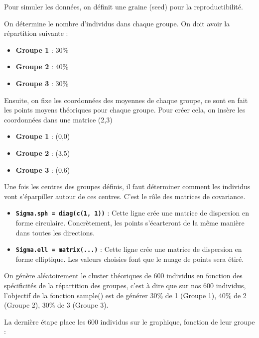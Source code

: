 \documentclass{article}
\providecommand{\tightlist}{%
  \setlength{\itemsep}{2pt}\setlength{\parskip}{0pt}}
\begin{document}
Pour simuler les données, on définit une graine (seed) pour la
reproductibilité.

On détermine le nombre d'individus dans chaque groupe. On doit avoir la
répartition suivante :

\begin{itemize}
\tightlist
\item
  \textbf{Groupe 1} : 30\%
\item
  \textbf{Groupe 2} : 40\%
\item
  \textbf{Groupe 3} : 30\%
\end{itemize}

Ensuite, on fixe les coordonnées des moyennes de chaque groupe, ce sont
en fait les points moyens théoriques pour chaque groupe. Pour créer
cela, on insère les coordonnées dans une matrice (2,3)

\begin{itemize}
\tightlist
\item
  \textbf{Groupe 1} : (0,0)
\item
  \textbf{Groupe 2} : (3,5)
\item
  \textbf{Groupe 3} : (0,6)
\end{itemize}

Une fois les centres des groupes définis, il faut déterminer comment les
individus vont s'éparpiller autour de ces centres. C'est le rôle des
matrices de covariance.

\begin{itemize}
\tightlist
\item
  \textbf{\texttt{Sigma.sph\ =\ diag(c(1,\ 1))}} : Cette ligne crée une
  matrice de dispersion en forme circulaire. Concrètement, les points
  s'écarteront de la même manière dans toutes les directions.
\item
  \textbf{\texttt{Sigma.ell\ =\ matrix(...)}} : Cette ligne crée une
  matrice de dispersion en forme elliptique. Les valeurs choisies font
  que le nuage de points sera étiré.
\end{itemize}

On génère aléatoirement le cluster théoriques de 600 individus en
fonction des spécificités de la répartition des groupes, c'est à dire
que sur nos 600 individus, l'objectif de la fonction sample() est de
générer 30\% de 1 (Groupe 1), 40\% de 2 (Groupe 2), 30\% de 3 (Groupe
3).

La dernière étape place les 600 individus sur le graphique, fonction de
leur groupe :
\end{document}
